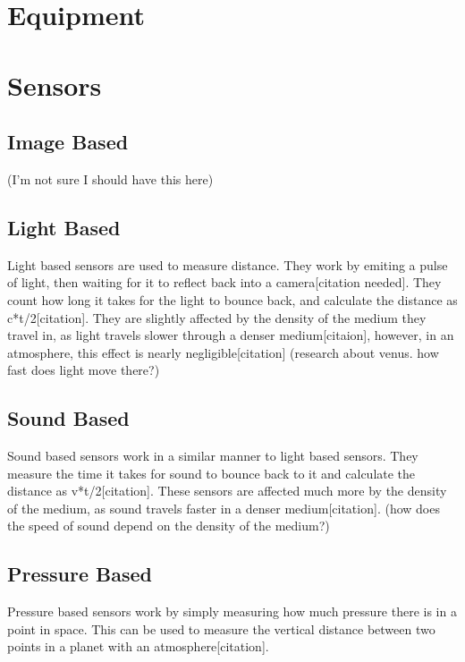 \section{Equipment}

\section{Sensors}
\subsection{Image Based}
(I'm not sure I should have this here)
\subsection{Light Based}
Light based sensors are used to measure distance. They work by emiting a pulse of light, then waiting for it to reflect back into a camera[citation needed]. They count how long it takes for the light to bounce back, and calculate the distance as {c*t/2}[citation]. They are slightly affected by the density of the medium they travel in, as light travels slower through a denser medium[citaion], however, in an atmosphere, this effect is nearly negligible[citation] (research about venus. how fast does light move there?)
\subsection{Sound Based}
Sound based sensors work in a similar manner to light based sensors. They measure the time it takes for sound to bounce back to it and calculate the distance as {v*t/2}[citation]. These sensors are affected much more by the density of the medium, as sound travels faster in a denser medium[citation]. (how does the speed of sound depend on the density of the medium?)
\subsection{Pressure Based}
Pressure based sensors work by simply measuring how much pressure there is in a point in space. This can be used to measure the vertical distance between two points in a planet with an atmosphere[citation].
